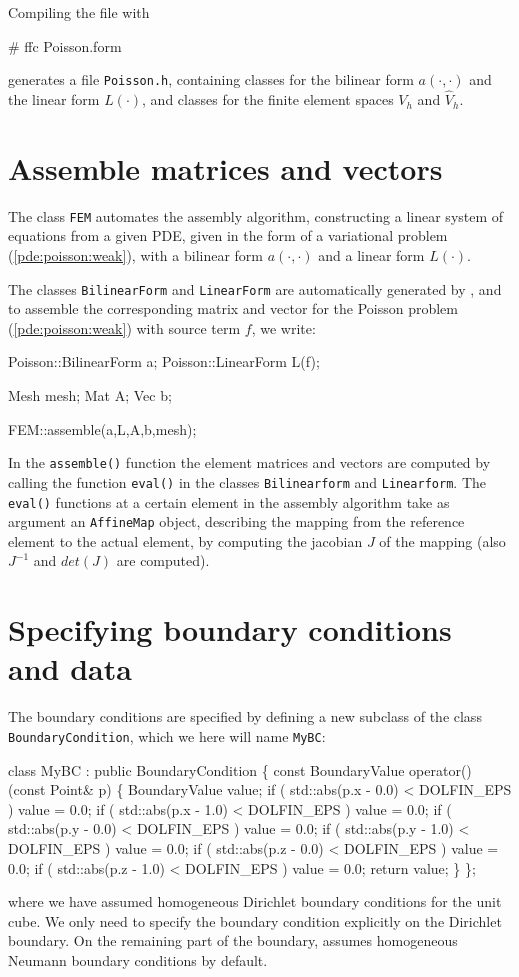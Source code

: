 Compiling the file with 
\begin{code}
# ffc Poisson.form
\end{code}
generates a file \texttt{Poisson.h}, containing classes for 
the bilinear form $a(\cdot,\cdot)$ and the linear form $L(\cdot)$, 
and classes for the finite element spaces $V_h$ and $\hat V_h$. 

\section{Assemble matrices and vectors}

The class \texttt{FEM} automates the assembly algorithm, constructing a linear 
system of equations from a given PDE, 
given in the form of a variational problem (\ref{pde:poisson:weak}), 
with a bilinear form $a(\cdot,\cdot)$ and a linear form $L(\cdot)$. 

The classes \texttt{BilinearForm} and \texttt{LinearForm} are automatically 
generated by \ffc{}, and to assemble the corresponding matrix and vector for 
the Poisson problem (\ref{pde:poisson:weak}) with source term $f$, we write:  
\begin{code}
Poisson::BilinearForm a;
Poisson::LinearForm L(f);

Mesh mesh; 
Mat A;
Vec b;

FEM::assemble(a,L,A,b,mesh);
\end{code}

In the \texttt{assemble()} function the element matrices and vectors are 
computed by calling the function \texttt{eval()} in the classes 
\texttt{Bilinearform} and \texttt{Linearform}. 
The \texttt{eval()} functions at a certain element in the assembly algorithm 
take as argument an \texttt{AffineMap} object, 
describing the mapping from the reference element to the actual element, 
by computing the jacobian $J$ of the mapping (also $J^{-1}$ and $det(J)$ 
are computed).  

\section{Specifying boundary conditions and data}

The boundary conditions are specified by defining a new subclass 
of the class \texttt{BoundaryCondition}, 
which we here will name \texttt{MyBC}: 
\begin{code}
  class MyBC : public BoundaryCondition
  \{
    const BoundaryValue operator() (const Point& p)
    \{
      BoundaryValue value;
      if ( std::abs(p.x - 0.0) < DOLFIN_EPS ) value = 0.0;
      if ( std::abs(p.x - 1.0) < DOLFIN_EPS ) value = 0.0;
      if ( std::abs(p.y - 0.0) < DOLFIN_EPS ) value = 0.0;
      if ( std::abs(p.y - 1.0) < DOLFIN_EPS ) value = 0.0;
      if ( std::abs(p.z - 0.0) < DOLFIN_EPS ) value = 0.0;
      if ( std::abs(p.z - 1.0) < DOLFIN_EPS ) value = 0.0;
        return value;
    \}
  \};
\end{code}
where we have assumed homogeneous Dirichlet boundary conditions for the 
unit cube. 
We only need to specify the boundary condition explicitly on the
Dirichlet boundary. On the remaining part of the boundary, \dolfin{}
assumes homogeneous Neumann boundary conditions by default.

